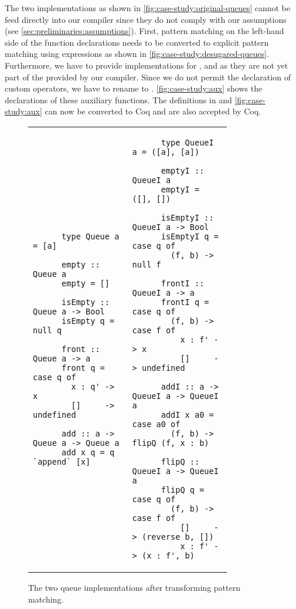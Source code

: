The two implementations as shown in \autoref{fig:case-study:original-queues} cannot be feed directly into our compiler since they do not comply with our assumptions (see \autoref{sec:preliminaries:assumptions}).
First, pattern matching on the left-hand side of the function declarations needs to be converted to explicit pattern matching using  expressions as shown in \autoref{fig:case-study:desugared-queues}.
Furthermore, we have to provide implementations for , \haskell{(++)} and  as they are not yet part of the  provided by our compiler.
Since we do not permit the declaration of custom operators, we have to rename \haskell{(++)} to .
\autoref{fig:case-study:aux} shows the declarations of these auxiliary functions.
The definitions in \label{fig:case-study:desugared-queues} and \autoref{fig:case-study:aux} can now be converted to Coq and are also accepted by Coq.

\begin{figure}[H]
  \begin{tabular}{p{0.40\linewidth} | p{0.40\linewidth}}
    \begin{verbatim}
      type Queue a = [a]

      empty :: Queue a
      empty = []

      isEmpty :: Queue a -> Bool
      isEmpty q = null q

      front :: Queue a -> a
      front q = case q of
        x : q' -> x
        []     -> undefined

      add :: a -> Queue a -> Queue a
      add x q = q `append` [x]
    \end{verbatim}
    &
    \begin{verbatim}
      type QueueI a = ([a], [a])

      emptyI :: QueueI a
      emptyI = ([], [])

      isEmptyI :: QueueI a -> Bool
      isEmptyI q = case q of
        (f, b) -> null f

      frontI :: QueueI a -> a
      frontI q = case q of
        (f, b) -> case f of
          x : f' -> x
          []     -> undefined

      addI :: a -> QueueI a -> QueueI a
      addI x a0 = case a0 of
        (f, b) -> flipQ (f, x : b)

      flipQ :: QueueI a -> QueueI a
      flipQ q = case q of
        (f, b) -> case f of
          []     -> (reverse b, [])
          x : f' -> (x : f', b)
    \end{verbatim}
  \end{tabular}
  \caption{
    The two queue implementations after transforming pattern matching.
  }
  \label{fig:case-study:desugared-queues}
\end{figure}


